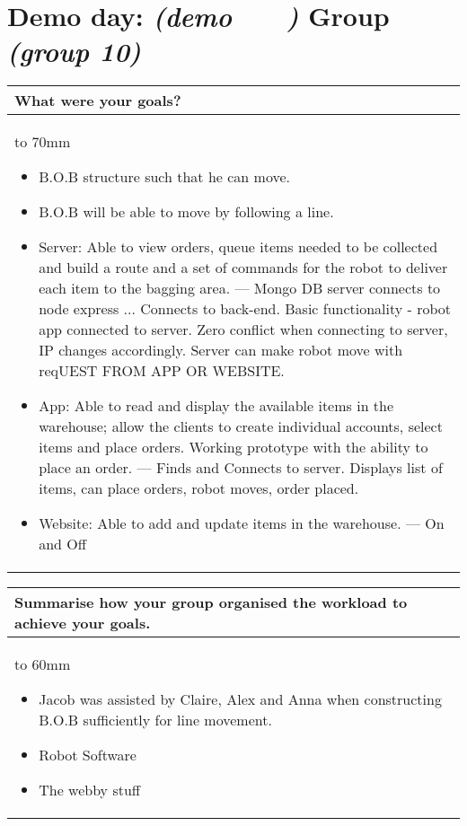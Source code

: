 \documentclass[a4paper]{article}
\newcommand{\colWidth}{141mm}
\begin{document}
 
\section*{Demo day: \textit{(demo   \  \  \  )} Group \textit{(group 10)}}


\begin{center}
\begin{tabular}{|p{\colWidth}|}
	\hline
	\cellcolor{blue!25}\large
	\textbf{What were your goals?}
	\\ \hline
	\vtop to 70mm{
\begin{itemize}
    \item B.O.B structure such that he can move.
    \item B.O.B will be able to move by following a line.
    \item Server: Able to view orders, queue items needed to be collected and build a route and a set of commands for the robot to deliver each item to the bagging area. --- Mongo DB server connects to node express ... Connects to back-end. Basic functionality  - robot app connected to server. Zero conflict when connecting to server, IP changes accordingly. Server can make robot move with reqUEST FROM APP OR WEBSITE.
    \item App: Able to read and display the available items in the warehouse; allow the clients to create individual accounts, select items and place orders.  Working prototype with the ability to place an order. --- Finds and Connects to server. Displays list of items, can place orders, robot moves, order placed.
    \item Website: Able to add and update items in the warehouse. --- On and Off 
\end{itemize}
  }
  \\
  \hline
\end{tabular}
\vskip 5mm


\begin{tabular}{|p{\colWidth}|}
	\hline
	\cellcolor{blue!25}\large
	\textbf{Summarise how your group organised the workload to achieve your goals.}
	\\ \hline
	\vtop to 60mm{
	\begin{itemize}
	    \item Jacob was assisted by Claire, Alex and Anna when constructing B.O.B sufficiently for line movement.
	    \item Robot Software
	    \item The webby stuff
	\end{itemize}
  }
  \\
  \hline
\end{tabular}
\vskip 5mm


\end{center}
\end{document}
